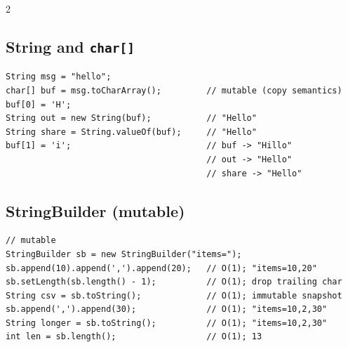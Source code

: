 \documentclass{article}
\begin{document}
\begin{multicols}{2}
\subsection{String and \texttt{char[]}}
\begin{lstlisting}
String msg = "hello";
char[] buf = msg.toCharArray();         // mutable (copy semantics)
buf[0] = 'H';
String out = new String(buf);           // "Hello"
String share = String.valueOf(buf);     // "Hello"
buf[1] = 'i';                           // buf -> "Hillo"
                                        // out -> "Hello"
                                        // share -> "Hello"
\end{lstlisting}

\subsection{StringBuilder (mutable)}
\begin{lstlisting}
// mutable
StringBuilder sb = new StringBuilder("items=");
sb.append(10).append(',').append(20);   // O(1); "items=10,20"
sb.setLength(sb.length() - 1);          // O(1); drop trailing char
String csv = sb.toString();             // O(1); immutable snapshot
sb.append(',').append(30);              // O(1); "items=10,2,30"
String longer = sb.toString();          // O(1); "items=10,2,30"
int len = sb.length();                  // O(1); 13
\end{lstlisting}




\end{multicols}
\end{document}
